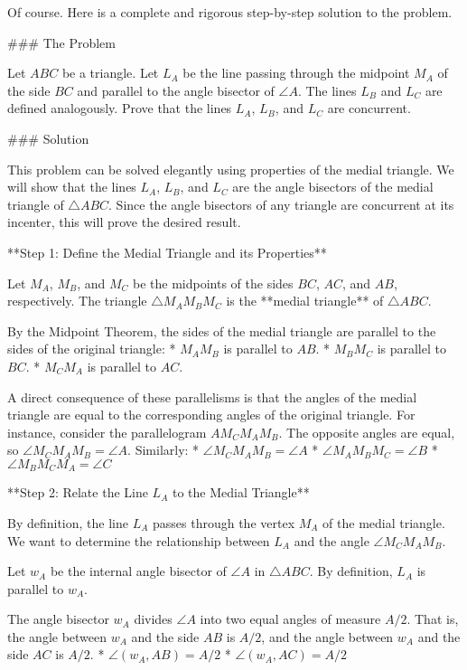 Of course. Here is a complete and rigorous step-by-step solution to the problem.

### The Problem

Let $ABC$ be a triangle. Let $L_A$ be the line passing through the midpoint $M_A$ of the side $BC$ and parallel to the angle bisector of $\angle A$. The lines $L_B$ and $L_C$ are defined analogously. Prove that the lines $L_A$, $L_B$, and $L_C$ are concurrent.

### Solution

This problem can be solved elegantly using properties of the medial triangle. We will show that the lines $L_A$, $L_B$, and $L_C$ are the angle bisectors of the medial triangle of $\triangle ABC$. Since the angle bisectors of any triangle are concurrent at its incenter, this will prove the desired result.

**Step 1: Define the Medial Triangle and its Properties**

Let $M_A$, $M_B$, and $M_C$ be the midpoints of the sides $BC$, $AC$, and $AB$, respectively. The triangle $\triangle M_A M_B M_C$ is the **medial triangle** of $\triangle ABC$.

By the Midpoint Theorem, the sides of the medial triangle are parallel to the sides of the original triangle:
*   $M_A M_B$ is parallel to $AB$.
*   $M_B M_C$ is parallel to $BC$.
*   $M_C M_A$ is parallel to $AC$.

A direct consequence of these parallelisms is that the angles of the medial triangle are equal to the corresponding angles of the original triangle. For instance, consider the parallelogram $AM_C M_A M_B$. The opposite angles are equal, so $\angle M_C M_A M_B = \angle A$. Similarly:
*   $\angle M_C M_A M_B = \angle A$
*   $\angle M_A M_B M_C = \angle B$
*   $\angle M_B M_C M_A = \angle C$

**Step 2: Relate the Line $L_A$ to the Medial Triangle**

By definition, the line $L_A$ passes through the vertex $M_A$ of the medial triangle. We want to determine the relationship between $L_A$ and the angle $\angle M_C M_A M_B$.

Let $w_A$ be the internal angle bisector of $\angle A$ in $\triangle ABC$. By definition, $L_A$ is parallel to $w_A$.

The angle bisector $w_A$ divides $\angle A$ into two equal angles of measure $A/2$. That is, the angle between $w_A$ and the side $AB$ is $A/2$, and the angle between $w_A$ and the side $AC$ is $A/2$.
*   $\angle(w_A, AB) = A/2$
*   $\angle(w_A, AC) = A/2$

